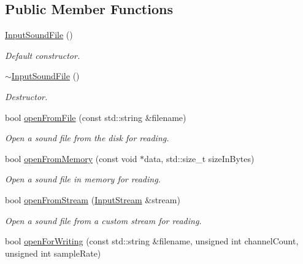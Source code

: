 \subsection*{Public Member Functions}
\begin{DoxyCompactItemize}
\item 
\mbox{\label{classsf_1_1_input_sound_file_a3b95347de25d1d93a3230287cf47a077}} 
\hyperlink{classsf_1_1_input_sound_file_a3b95347de25d1d93a3230287cf47a077}{Input\+Sound\+File} ()
\begin{DoxyCompactList}\small\item\em Default constructor. \end{DoxyCompactList}\item 
\mbox{\label{classsf_1_1_input_sound_file_a326a1a486587038123de0c187bf5c635}} 
\hyperlink{classsf_1_1_input_sound_file_a326a1a486587038123de0c187bf5c635}{$\sim$\+Input\+Sound\+File} ()
\begin{DoxyCompactList}\small\item\em Destructor. \end{DoxyCompactList}\item 
bool \hyperlink{classsf_1_1_input_sound_file_af68e54bc9bfac19554c84601156fe93f}{open\+From\+File} (const std\+::string \&filename)
\begin{DoxyCompactList}\small\item\em Open a sound file from the disk for reading. \end{DoxyCompactList}\item 
bool \hyperlink{classsf_1_1_input_sound_file_a4e034a8e9e69ca3c33a3f11180250400}{open\+From\+Memory} (const void $\ast$data, std\+::size\+\_\+t size\+In\+Bytes)
\begin{DoxyCompactList}\small\item\em Open a sound file in memory for reading. \end{DoxyCompactList}\item 
bool \hyperlink{classsf_1_1_input_sound_file_a32b76497aeb088a2b46dc6efd819b909}{open\+From\+Stream} (\hyperlink{classsf_1_1_input_stream}{Input\+Stream} \&stream)
\begin{DoxyCompactList}\small\item\em Open a sound file from a custom stream for reading. \end{DoxyCompactList}\item 
bool \hyperlink{classsf_1_1_input_sound_file_a84f32fdf5fa619538506395c3c5a030a}{open\+For\+Writing} (const std\+::string \&filename, unsigned int channel\+Count, unsigned int sample\+Rate)

\end{DoxyCompactItemize}
